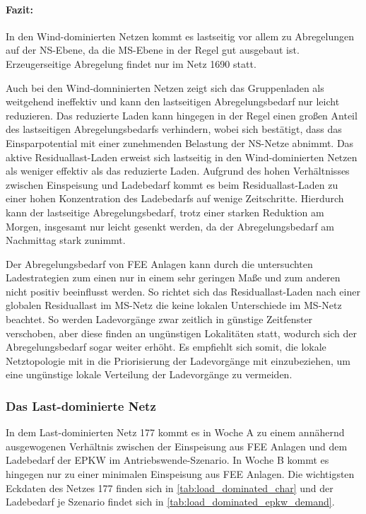 \paragraph{Fazit:}

In den Wind-dominierten Netzen kommt es lastseitig vor allem zu Abregelungen auf der \gls{NS}-Ebene, da die \gls{MS}-Ebene in der Regel gut ausgebaut ist.
Erzeugerseitige Abregelung findet nur im Netz \num{1690} statt.\medskip

Auch bei den Wind-domninierten Netzen zeigt sich das Gruppenladen als weitgehend ineffektiv und kann den lastseitigen Abregelungsbedarf nur leicht reduzieren.
Das reduzierte Laden kann hingegen in der Regel einen großen Anteil des lastseitigen Abregelungsbedarfs verhindern, wobei sich bestätigt, dass das Einsparpotential mit einer zunehmenden Belastung der \gls{NS}-Netze abnimmt.
Das aktive Residuallast-Laden erweist sich lastseitig in den Wind-dominierten Netzen als weniger effektiv als das reduzierte Laden.
Aufgrund des hohen Verhältnisses zwischen Einspeisung und Ladebedarf kommt es beim Residuallast-Laden zu einer hohen Konzentration des Ladebedarfs auf wenige Zeitschritte.
Hierdurch kann der lastseitige Abregelungsbedarf, trotz einer starken Reduktion am Morgen, insgesamt nur leicht gesenkt werden, da der Abregelungsbedarf am Nachmittag stark zunimmt.\medskip

Der Abregelungsbedarf von \gls{FEE} Anlagen kann durch die untersuchten Ladestrategien zum einen nur in einem sehr geringen Maße und zum anderen nicht positiv beeinflusst werden.
So richtet sich das Residuallast-Laden nach einer globalen Residuallast im \gls{MS}-Netz die keine lokalen Unterschiede im \gls{MS}-Netz beachtet.
So werden Ladevorgänge zwar zeitlich in günstige Zeitfenster verschoben, aber diese finden an ungünstigen Lokalitäten statt, wodurch sich der Abregelungsbedarf sogar weiter erhöht.
Es empfiehlt sich somit, die lokale Netztopologie mit in die Priorisierung der Ladevorgänge mit einzubeziehen, um eine ungünstige lokale Verteilung der Ladevorgänge zu vermeiden.


\subsubsection{Das Last-dominierte Netz}

In dem Last-dominierten Netz \num{177} kommt es in Woche A zu einem annähernd ausgewogenen Verhältnis zwischen der Einspeisung aus \gls{FEE} Anlagen und dem Ladebedarf der \gls{EPKW} im Antriebswende-Szenario.
In Woche B kommt es hingegen nur zu einer minimalen Einspeisung aus \gls{FEE} Anlagen.
Die wichtigsten Eckdaten des Netzes \num{177} finden sich in \autoref{tab:load_dominated_char} und der Ladebedarf je Szenario findet sich in \autoref{tab:load_dominated_epkw_demand}.

